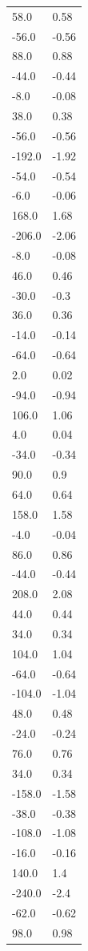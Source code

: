 \begin{longtable}{ll}
58.0 & 0.58 \\
-56.0 & -0.56 \\
88.0 & 0.88 \\
-44.0 & -0.44 \\
-8.0 & -0.08 \\
38.0 & 0.38 \\
-56.0 & -0.56 \\
-192.0 & -1.92 \\
-54.0 & -0.54 \\
-6.0 & -0.06 \\
168.0 & 1.68 \\
-206.0 & -2.06 \\
-8.0 & -0.08 \\
46.0 & 0.46 \\
-30.0 & -0.3 \\
36.0 & 0.36 \\
-14.0 & -0.14 \\
-64.0 & -0.64 \\
2.0 & 0.02 \\
-94.0 & -0.94 \\
106.0 & 1.06 \\
4.0 & 0.04 \\
-34.0 & -0.34 \\
90.0 & 0.9 \\
64.0 & 0.64 \\
158.0 & 1.58 \\
-4.0 & -0.04 \\
86.0 & 0.86 \\
-44.0 & -0.44 \\
208.0 & 2.08 \\
44.0 & 0.44 \\
34.0 & 0.34 \\
104.0 & 1.04 \\
-64.0 & -0.64 \\
-104.0 & -1.04 \\
48.0 & 0.48 \\
-24.0 & -0.24 \\
76.0 & 0.76 \\
34.0 & 0.34 \\
-158.0 & -1.58 \\
-38.0 & -0.38 \\
-108.0 & -1.08 \\
-16.0 & -0.16 \\
140.0 & 1.4 \\
-240.0 & -2.4 \\
-62.0 & -0.62 \\
98.0 & 0.98 \\

\end{longtable}
